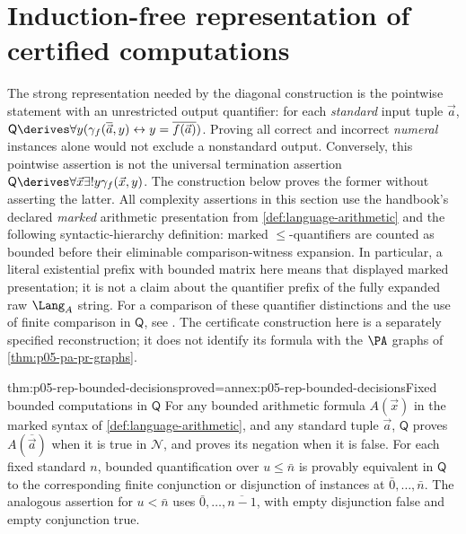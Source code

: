 \section{Induction-free representation of certified computations}
\label{sec:p05-representability}

The strong representation needed by the diagonal construction is the
pointwise statement with an unrestricted output quantifier: for each
\emph{standard} input tuple \(\vec a\),
\(\mathsf Q\derives\forall y(\gamma_f(\overline{\vec a},y)
\leftrightarrow y=\overline{f(\vec a)})\).
Proving all correct and incorrect \emph{numeral} instances alone would not
exclude a nonstandard output. Conversely, this pointwise assertion is not
the universal termination assertion
\(\mathsf Q\derives\forall\vec x\exists!y\gamma_f(\vec x,y)\).
The construction below proves the former without asserting the latter.
All complexity assertions in this section use the handbook's declared
\emph{marked} arithmetic presentation from
\cref{def:language-arithmetic} and the following syntactic-hierarchy
definition: marked \(\leq\)-quantifiers are counted as bounded before
their eliminable comparison-witness expansion. In particular, a literal
existential prefix with bounded matrix here means that displayed marked
presentation; it is not a claim about the quantifier prefix of the fully
expanded raw \(\Lang_A\) string.
For a comparison of these quantifier distinctions and the use of finite
comparison in \(\mathsf Q\), see \cite[chs.~11,16--17,39]{Smith2020QRepresentation}.
The certificate construction here is a separately specified reconstruction;
it does not identify its formula with the \(\PA\) graphs of
\cref{thm:p05-pa-pr-graphs}.

\begin{hblemma}{thm:p05-rep-bounded-decisions}{proved=annex:p05-rep-bounded-decisions}{Fixed bounded computations in \(\mathsf Q\)}
For any bounded arithmetic formula \(A(\vec x)\) in the marked syntax of
\cref{def:language-arithmetic}, and any standard tuple \(\vec a\),
\(\mathsf Q\) proves \(A(\overline{\vec a})\) when it is true in
\(\mathcal N\), and proves its negation when it is false.
For each fixed standard \(n\), bounded quantification over
\(u\leq\bar n\) is provably equivalent in \(\mathsf Q\) to the
corresponding finite conjunction or disjunction of instances at
\(\bar0,\ldots,\bar n\). The analogous assertion for \(u<\bar n\)
uses \(\bar0,\ldots,\overline{n-1}\), with empty disjunction false and
empty conjunction true.
\end{hblemma}

